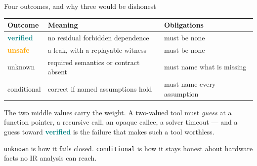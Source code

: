 \documentclass[aspectratio=169,10pt]{beamer}
\newcommand{\good}[1]{\textcolor{Teal}{\textbf{#1}}}
\newcommand{\bad}[1]{\textcolor{Orange}{\textbf{#1}}}
\newcommand{\code}[1]{\texttt{#1}}
\begin{document}
\begin{frame}{Four outcomes, and why three would be dishonest}
  \begin{center}
  \begin{tabular}{@{}l l l@{}}
  \toprule
  Outcome & Meaning & Obligations \\
  \midrule
  \good{verified}    & no residual forbidden dependence        & must be none \\
  \bad{unsafe}       & a leak, with a replayable witness       & must be none \\
  unknown            & required semantics or contract absent   & must name what is missing \\
  conditional        & correct if named assumptions hold       & must name every assumption \\
  \bottomrule
  \end{tabular}
  \end{center}

  \vspace{1em}
  The two middle values carry the weight. A two-valued tool must \emph{guess} at
  a function pointer, a recursive call, an opaque callee, a solver timeout --- and
  a guess toward \good{verified} is the failure that makes such a tool worthless.

  \vspace{0.5em}
  \code{unknown} is how it fails closed. \code{conditional} is how it stays honest
  about hardware facts no IR analysis can reach.
\end{frame}
\end{document}
